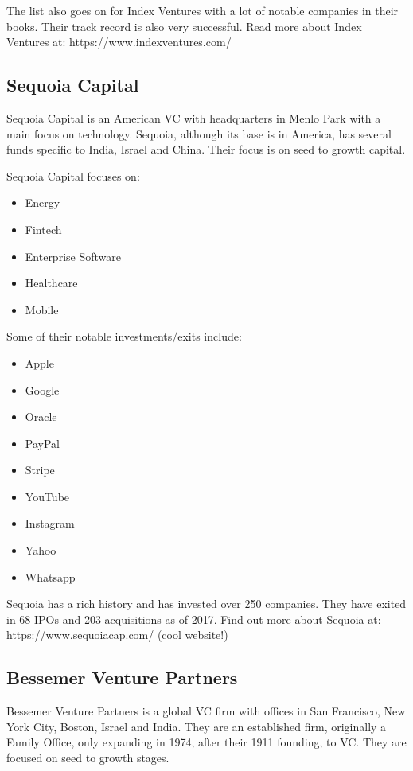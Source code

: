\documentclass[a4paper]{article}
\begin{document}
{\vspace{5pt}
\noindent The list also goes on for Index Ventures with a lot of notable companies in their books. Their track record is also very successful. Read more about Index Ventures at: https://www.indexventures.com/

\subsection{Sequoia Capital}
Sequoia Capital is an American VC with headquarters in Menlo Park with a main focus on technology. Sequoia, although its base is in America, has several funds specific to India, Israel and China. Their focus is on seed to growth capital.

\vspace{5pt}
\noindent Sequoia Capital focuses on:
\begin{itemize}
	\item Energy
	\item Fintech
	\item Enterprise Software
	\item Healthcare
	\item Mobile
\end{itemize}

\vspace{5pt}
\noindent Some of their notable investments/exits include:
\begin{itemize}
	\item Apple
	\item Google
	\item Oracle
	\item PayPal
	\item Stripe
	\item YouTube
	\item Instagram
	\item Yahoo
	\item Whatsapp
\end{itemize}

\vspace{5pt}
\noindent Sequoia has a rich history and has invested over 250 companies. They have exited in 68 IPOs and 203 acquisitions as of 2017. Find out more about Sequoia at: https://www.sequoiacap.com/ (cool website!)

\subsection{Bessemer Venture Partners}
Bessemer Venture Partners is a global VC firm with offices in San Francisco, New York City, Boston, Israel and India. They are an established firm, originally a Family Office, only expanding in 1974, after their 1911 founding, to VC. They are focused on seed to growth stages.

}
\end{document}
